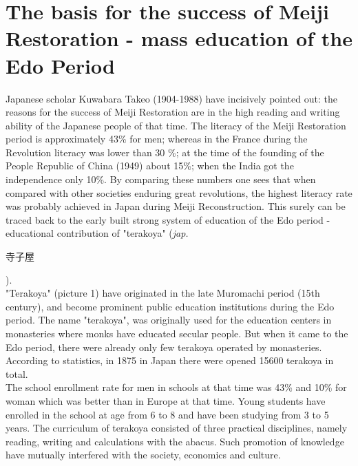 \documentclass[11pt]{book}
\begin{document}
\section{The basis for the success of Meiji Restoration - mass education of the Edo Period}
Japanese scholar Kuwabara Takeo (1904-1988) have incisively pointed out: the reasons for the success of Meiji Restoration are in the high reading
and writing ability of the Japanese people of that time. The literacy of the Meiji Restoration period is approximately 43\% for men; whereas
in the France during the Revolution literacy was lower than 30 \%; at the time of the founding of the People Republic of China (1949) about 
15\%; when the India got the independence only 10\%. By comparing these numbers one sees 
that when compared with other societies enduring great revolutions, the highest literacy rate was probably achieved in Japan during Meiji
Reconstruction. This surely can be traced back to the early built strong system of education of the Edo period - educational 
contribution of "terakoya" (\textit{jap.}
\begin{CJK}{UTF8}{bsmi} 寺子屋\end{CJK}).\\
"Terakoya" (picture 1) have originated in the late Muromachi period (15th century), and become prominent public education institutions
during the Edo period. The name "terakoya", was originally used for the education centers in monasteries where monks have educated secular
people. But when it came to the Edo period, there were already only few terakoya operated by monasteries. According to statistics, in 1875
in Japan there were opened 15600 terakoya in total.\\
The school enrollment rate for men in schools at that time was 43\% and 10\% for woman which was better than in Europe at that time. Young students
have enrolled in the school at age from 6 to 8 and have been studying from 3 to 5 years. The curriculum of terakoya consisted of three practical
disciplines, namely reading, writing and calculations with the abacus. Such promotion of knowledge have mutually interfered with the society, 
economics and culture.
\end{document}
